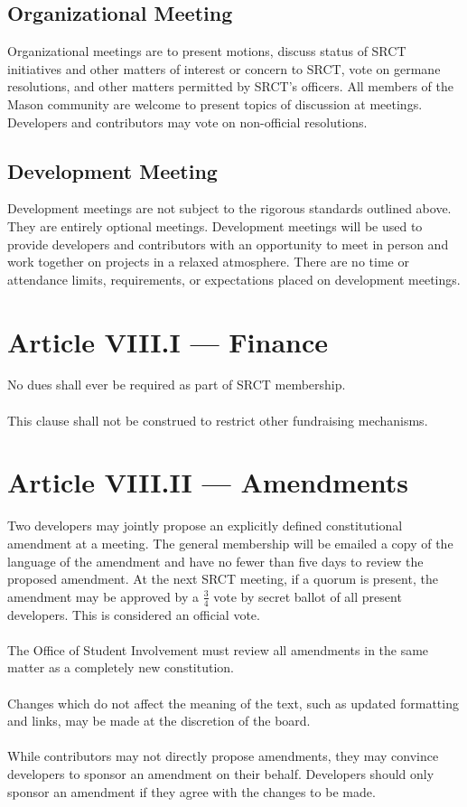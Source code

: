 \documentclass{article}
\begin{document}
  \subsection{Organizational Meeting}
  Organizational meetings are to present motions, discuss status of SRCT 
  initiatives and other matters of interest or concern to SRCT, vote on 
  germane resolutions, and other matters permitted by SRCT's officers. 
  All members of the Mason community are welcome to present topics of 
  discussion at meetings. Developers and contributors may vote on 
  non-official resolutions.
  
  \subsection{Development Meeting}
  Development meetings are not subject to the rigorous standards 
  outlined above. They are entirely optional meetings. Development 
  meetings will be used to provide developers and contributors with an 
  opportunity to meet in person and work together on projects in a 
  relaxed atmosphere. There are no time or attendance limits, 
  requirements, or expectations placed on development meetings.
  
  \section{Article VIII.I --- Finance}
  No dues shall ever be required as part of SRCT membership.
  \\ \\
  This clause shall not be construed to restrict other fundraising 
  mechanisms.
  
  \section{Article VIII.II --- Amendments}
  Two developers may jointly propose an explicitly defined 
  constitutional amendment at a meeting. The general membership will be 
  emailed a copy of the language of the amendment and have no fewer than
  five days to review the proposed amendment. At the next SRCT meeting, if a
  quorum is present, the amendment may be approved by a $\frac{3}{4}$ 
  vote by secret ballot of all present developers. This is considered an 
  official vote.
  \\ \\
  The Office of Student Involvement must review all amendments in the 
  same matter as a completely new constitution.
  \\ \\
  Changes which do not affect the meaning of the text, such as updated 
  formatting and links, may be made at the discretion of the board.
  \\ \\
  While contributors may not directly propose amendments, they may convince
  developers to sponsor an amendment on their behalf. Developers should only
  sponsor an amendment if they agree with the changes to be made.
  
\end{document}
